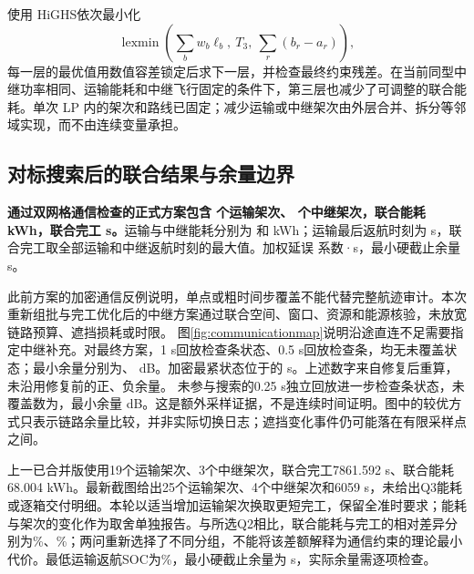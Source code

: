 使用 HiGHS\cite{highs}依次最小化
\begin{equation}
\operatorname{lexmin}\left(\sum_bw_b\ell_b,\ T_3,\ \sum_r(b_r-a_r)\right),\label{eq:q3objective}
\end{equation}
每一层的最优值用数值容差锁定后求下一层，并检查最终约束残差。在当前同型中继功率相同、运输能耗和中继飞行固定的条件下，第三层也减少了可调整的联合能耗。单次 LP 内的架次和路线已固定；减少运输或中继架次由外层合并、拆分等邻域实现，而不由连续变量承担。

\subsection{对标搜索后的联合结果与余量边界}
\textbf{通过双网格通信检查的正式方案包含 \QThreeTrips{} 个运输架次、\RelayTrips{} 个中继架次，联合能耗 \JointEnergy{} kWh，联合完工 \JointTime{} s。}运输与中继能耗分别为 \QThreeTransportEnergy{} 和 \RelayEnergy{} kWh；运输最后返航时刻为 \QThreeTransportTime{} s，联合完工取全部运输和中继返航时刻的最大值。加权延误 \QThreeLate{} 系数·s，最小硬截止余量 \HardSlack{} s。

此前方案的加密通信反例说明，单点或粗时间步覆盖不能代替完整航迹审计。本次重新组批与完工优化后的中继方案通过联合空间、窗口、资源和能源核验，未放宽链路预算、遮挡损耗或时限。
图\ref{fig:communicationmap}说明沿途直连不足需要指定中继补充。对最终方案，1 s回放检查\StatesOne{}条状态、0.5 s回放检查\StatesHalf{}条，均无未覆盖状态；最小余量分别为\MarginOne{}、\MarginHalf{} dB。加密最紧状态位于\CriticalTripHalf{}的\CriticalTimeHalf{} s。上述数字来自修复后重算，未沿用修复前的正、负余量。
未参与搜索的0.25 s独立回放进一步检查\StatesQuarter{}条状态，未覆盖数为\ViolationsQuarter{}，最小余量\MarginQuarter{} dB。这是额外采样证据，不是连续时间证明。图中的较优方式只表示链路余量比较，并非实际切换日志；遮挡变化事件仍可能落在有限采样点之间。

上一已合并版使用19个运输架次、3个中继架次，联合完工7861.592 s、联合能耗68.004 kWh。最新截图给出25个运输架次、4个中继架次和6059 s，未给出Q3能耗或逐箱交付明细。本轮以适当增加运输架次换取更短完工，保留全准时要求；能耗与架次的变化作为取舍单独报告。与所选Q2相比，联合能耗与完工的相对差异分别为\EnergyIncrease\%、\TimeIncrease\%；两问重新选择了不同分组，不能将该差额解释为通信约束的理论最小代价。最低运输返航SOC为\MinSoc\%，最小硬截止余量为\HardSlack{} s，实际余量需逐项检查。

